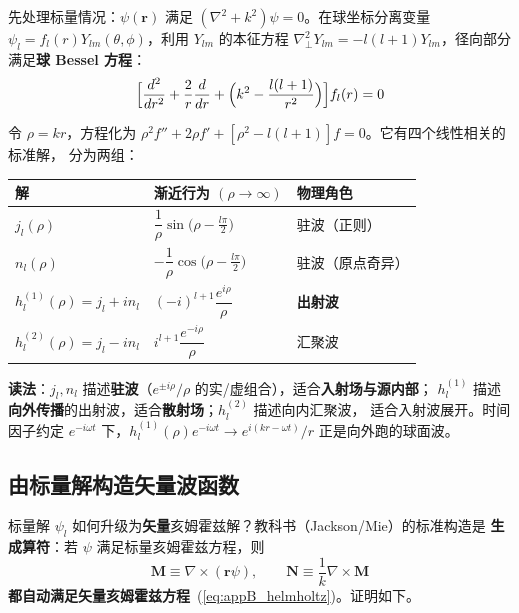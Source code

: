 先处理标量情况：$\psi(\mathbf{r})$ 满足 $(\nabla^2+k^2)\psi=0$。在球坐标分离变量
$\psi_l=f_l(r)Y_{lm}(\theta,\phi)$，利用 $Y_{lm}$ 的本征方程
$\nabla_\perp^2Y_{lm}=-l(l+1)Y_{lm}$，径向部分满足\textbf{球 Bessel 方程}：
\begin{equation}
  \Bigl[\frac{d^2}{dr^2}+\frac{2}{r}\frac{d}{dr}+\Bigl(k^2-\frac{l(l+1)}{r^2}\Bigr)\Bigr]f_l(r)=0
  \label{eq:appB_sphbessel}
\end{equation}

令 $\rho=kr$，方程化为 $\rho^2f''+2\rho f'+[\rho^2-l(l+1)]f=0$。它有四个线性相关的标准解，
分为两组：

\begin{center}
\begin{tabular}{lll}
\toprule
\textbf{解} & \textbf{渐近行为} $(\rho\to\infty)$ & \textbf{物理角色} \\
\midrule
$j_l(\rho)$ & $\dfrac{1}{\rho}\sin\bigl(\rho-\frac{l\pi}{2}\bigr)$ & 驻波（正则） \\
$n_l(\rho)$ & $-\dfrac{1}{\rho}\cos\bigl(\rho-\frac{l\pi}{2}\bigr)$ & 驻波（原点奇异） \\
$h_l^{(1)}(\rho)=j_l+in_l$ & $(-i)^{l+1}\dfrac{e^{i\rho}}{\rho}$ & \textbf{出射波} \\
$h_l^{(2)}(\rho)=j_l-in_l$ & $i^{l+1}\dfrac{e^{-i\rho}}{\rho}$ & 汇聚波 \\
\bottomrule
\end{tabular}
\end{center}

\begin{noteworthy}
\textbf{读法}：$j_l,n_l$ 描述\textbf{驻波}（$e^{\pm i\rho}/\rho$ 的实/虚组合），适合\textbf{入射场与源内部}；
$h_l^{(1)}$ 描述\textbf{向外传播}的出射波，适合\textbf{散射场}；$h_l^{(2)}$ 描述向内汇聚波，
适合入射波展开。时间因子约定 $e^{-i\omega t}$ 下，$h_l^{(1)}(\rho)e^{-i\omega t}\to e^{i(kr-\omega t)}/r$
正是向外跑的球面波。
\end{noteworthy}

\subsection{由标量解构造矢量波函数}

标量解 $\psi_l$ 如何升级为\textbf{矢量}亥姆霍兹解？教科书（Jackson/Mie）的标准构造是
\textbf{生成算符}：若 $\psi$ 满足标量亥姆霍兹方程，则
\begin{equation}
  \mathbf{M}\equiv\nabla\times(\mathbf{r}\psi),\qquad
  \mathbf{N}\equiv\frac{1}{k}\nabla\times\mathbf{M}
  \label{eq:appB_MN}
\end{equation}
\textbf{都自动满足矢量亥姆霍兹方程}~(\ref{eq:appB_helmholtz})。证明如下。

